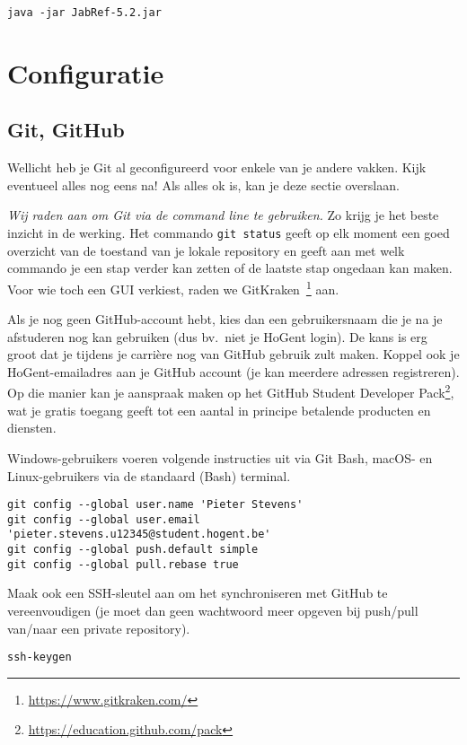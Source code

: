 \begin{verbatim}
java -jar JabRef-5.2.jar
\end{verbatim}

\section{Configuratie}

\subsection{Git, GitHub}

Wellicht heb je Git al geconfigureerd voor enkele van je andere vakken. Kijk eventueel alles nog eens na! Als alles ok is, kan je deze sectie overslaan.

\emph{Wij raden aan om Git via de command line te gebruiken.} Zo krijg je het beste inzicht in de werking. Het commando \texttt{git status} geeft op elk moment een goed overzicht van de toestand van je lokale repository en geeft aan met welk commando je een stap verder kan zetten of de laatste stap ongedaan kan maken. Voor wie toch een GUI verkiest, raden we GitKraken~\footnote{\url{https://www.gitkraken.com/}} aan.

Als je nog geen GitHub-account hebt, kies dan een gebruikersnaam die je na je afstuderen nog kan gebruiken (dus bv.~niet je HoGent login). De kans is erg groot dat je tijdens je carrière nog van GitHub gebruik zult maken. Koppel ook je HoGent-emailadres aan je GitHub account (je kan meerdere adressen registreren). Op die manier kan je aanspraak maken op het GitHub Student Developer Pack\footnote{\url{https://education.github.com/pack}}, wat je gratis toegang geeft tot een aantal in principe betalende producten en diensten.

Windows-gebruikers voeren volgende instructies uit via Git Bash, macOS- en Linux-gebruikers via de standaard (Bash) terminal.

\begin{verbatim}
git config --global user.name 'Pieter Stevens'
git config --global user.email 'pieter.stevens.u12345@student.hogent.be'
git config --global push.default simple
git config --global pull.rebase true
\end{verbatim}

Maak ook een SSH-sleutel aan om het synchroniseren met GitHub te vereenvoudigen (je moet dan geen wachtwoord meer opgeven bij push/pull van/naar een private repository).

\begin{verbatim}
ssh-keygen
\end{verbatim}

